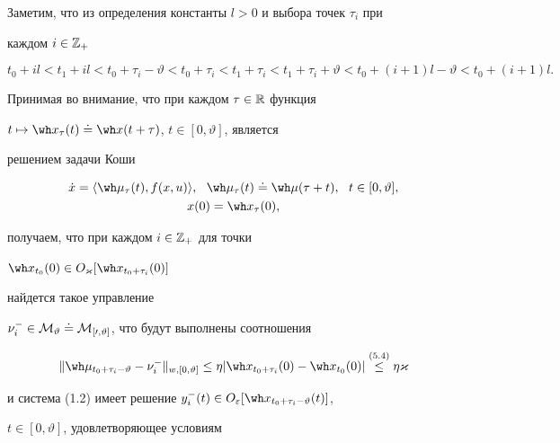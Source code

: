 Заметим, что из определения константы $l>0$ и выбора точек $\tau_i$ при


каждом $i\in\Bbb Z_+$


\begin{equation}


t_0+il<t_1+il<t_0+\tau_i-\vartheta


<t_0+\tau_i<t_1+\tau_i<t_1+\tau_i+\vartheta<


t_0+(i+1)l-\vartheta <t_0+(i+1)l.


\end{equation}





Принимая во внимание, что при каждом $\tau\in\Bbb R$ функция


$t\mapsto\wh x_{\tau}(t)


\doteq\wh x(t+\tau)$, $t\in[0,\vartheta]$, является


решением задачи Коши


\begin{gather*} \Dot x=\langle\wh\mu_{\tau}(t),f(x,u)\rangle


,\ \ \wh\mu_\tau(t)\doteq\wh \mu(\tau+t),\ \ t\in[0,\vartheta], \\


x(0)=\wh x_{\tau}(0),


\end{gather*}


получаем, что при каждом $i\in\Bbb Z_+$ для точки


$\wh x_{t_0}(0)\in O_{\varkappa}[\wh x_{t_0+\tau_i}(0)]$


найдется такое управление


$\nu_i^-\in\cal M_\vartheta\doteq


\cal M_{[0,\vartheta]}$, что будут выполнены соотношения


\begin{equation}


\|\wh\mu_{t_0+\tau_i-\vartheta}-\nu_i^-\|_{w,[0,\vartheta]}


\le\eta|\wh x_{t_0+\tau_i}(0)-\wh x_{t_0}(0)|


\up{(5.4)}{\le}\eta{\varkappa}


\end{equation}


и система (1.2) имеет решение $y_i^-(t)


\in O_\varepsilon[\wh x_{t_0+\tau_i-\vartheta}(t)]$,


$t\in[0,\vartheta]$, удовлетворяющее условиям


